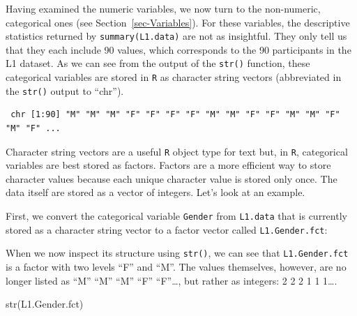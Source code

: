 \documentclass[
  letterpaper,
  DIV=11,
  numbers=noendperiod]{scrreprt}
\newenvironment{Shaded}{\begin{snugshade}}{\end{snugshade}}
\newcommand{\FunctionTok}[1]{\textcolor[rgb]{0.28,0.35,0.67}{#1}}
\newcommand{\NormalTok}[1]{\textcolor[rgb]{0.00,0.23,0.31}{#1}}
\newcommand{\OtherTok}[1]{\textcolor[rgb]{0.00,0.23,0.31}{#1}}
\newcommand{\SpecialCharTok}[1]{\textcolor[rgb]{0.37,0.37,0.37}{#1}}
\begin{document}
Having examined the numeric variables, we now turn to the non-numeric,
categorical ones (see Section~\ref{sec-Variables}). For these variables,
the descriptive statistics returned by \texttt{summary(L1.data)} are not
as insightful. They only tell us that they each include 90 values, which
corresponds to the 90 participants in the L1 dataset. As we can see from
the output of the \texttt{str()} function, these categorical variables
are stored in \texttt{R} as character string vectors (abbreviated in the
\texttt{str()} output to ``chr'').

\begin{Shaded}
\end{Shaded}

\begin{verbatim}
 chr [1:90] "M" "M" "M" "F" "F" "F" "F" "M" "M" "F" "F" "M" "M" "F" "M" "F" ...
\end{verbatim}

Character string vectors are a useful \texttt{R} object type for text
but, in \texttt{R}, categorical variables are best stored as factors.
Factors are a more efficient way to store character values because each
unique character value is stored only once. The data itself are stored
as a vector of integers. Let's look at an example.

First, we convert the categorical variable \texttt{Gender} from
\texttt{L1.data} that is currently stored as a character string vector
to a factor vector called \texttt{L1.Gender.fct}:

\begin{Shaded}
\end{Shaded}

When we now inspect its structure using \texttt{str()}, we can see that
\texttt{L1.Gender.fct} is a factor with two levels ``F'' and ``M''. The
values themselves, however, are no longer listed as ``M'' ``M'' ``M''
``F'' ``F''\ldots, but rather as integers: 2 2 2 1 1 1\ldots.

\begin{Shaded}
\begin{Highlighting}[]
\FunctionTok{str}\NormalTok{(L1.Gender.fct)}
\end{Highlighting}
\end{Shaded}
\end{document}
